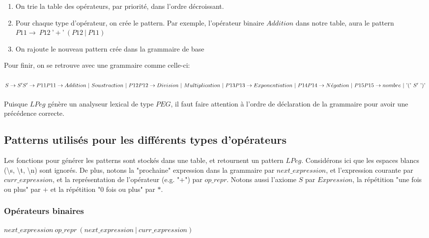 \documentclass{article}
\begin{document}
\begin{enumerate}
	\item On trie la table des opérateurs, par priorité, dans l'ordre décroissant.
	\item Pour chaque type d'opérateur, on crée le pattern. Par exemple, l'opérateur binaire $Addition$ dans notre table, aura le pattern \\ $P11 \rightarrow \ P12 \ \textrm{'}+\textrm{'} \ (P12 \ | \ P11)$
	\item On rajoute le nouveau pattern crée dans la grammaire de base
\end{enumerate}
Pour finir, on se retrouve avec une grammaire comme celle-ci: \\ \\
\begin{math}
S \rightarrow S' \\
S' \rightarrow P11 \\
P11 \rightarrow Addition \ | \ Soustraction \ | \ P12 \\
P12 \rightarrow Division \ | \ Multiplication \ | \ P13 \\
P13 \rightarrow Exponentiation \ | \ P14 \\
P14 \rightarrow N\acute{e}gation \ | \ P15 \\
P15 \rightarrow nombre \ | \ \textrm{'}(\textrm{'} \ S' \ \textrm{'})\textrm{'}
\end{math} \\ \\
Puisque $LPeg$ génère un analyseur lexical de type $PEG$, il faut faire attention à l'ordre de déclaration de la grammaire pour avoir une précédence correcte.

\subsection{Patterns utilisés pour les différents types d'opérateurs}
Les fonctions pour générer les patterns sont stockés dans une table, et retournent un pattern $LPeg$. Considérons ici que les espaces blancs (\textbackslash s, \textbackslash t, \textbackslash n) sont ignorés. De plus, notons la "prochaine" expression dans la grammaire par $next\_expression$, et l'expression courante par $curr\_expression$, et la représentation de l'opérateur (e.g. "+") par $op\_repr$. Notons aussi l'axiome $S$ par $Expression$, la répétition "une fois ou plus" par $+$ et la répétition "0 fois ou plus" par $*$.
\subsubsection{Opérateurs binaires}
$next\_expression \ op\_repr \ (next\_expression \ | \ curr\_expression)$
\end{document}
